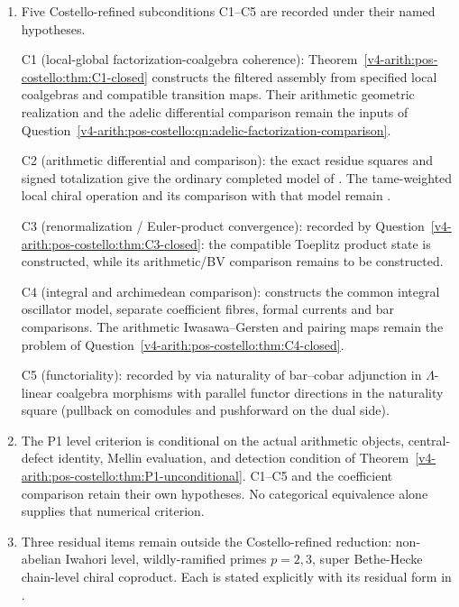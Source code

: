 \begin{enumerate}
\item Five Costello-refined subconditions C1--C5 are recorded under
their named hypotheses.

C1 (local-global factorization-coalgebra coherence):
Theorem~\ref{v4-arith:pos-costello:thm:C1-closed} constructs the
filtered assembly from specified local coalgebras and compatible
transition maps. Their arithmetic geometric realization and the
adelic differential comparison remain the inputs of
Question~\ref{v4-arith:pos-costello:qn:adelic-factorization-comparison}.

C2 (arithmetic differential and comparison): the exact residue
squares and signed totalization give the ordinary completed model
of . The tame-weighted
local chiral operation and its comparison with that model remain
.

C3 (renormalization / Euler-product convergence): recorded by
Question~\ref{v4-arith:pos-costello:thm:C3-closed}: the compatible
Toeplitz product state is constructed, while its arithmetic/BV
comparison remains to be constructed.

C4 (integral and archimedean comparison):
 constructs the common integral
oscillator model, separate coefficient fibres, formal currents and
bar comparisons. The arithmetic Iwasawa--Gersten and pairing maps
remain the problem of
Question~\ref{v4-arith:pos-costello:thm:C4-closed}.

C5 (functoriality): recorded by
 via naturality of
bar--cobar adjunction in \(\Lambda\)-linear coalgebra morphisms
with parallel functor directions in the naturality square
(pullback on comodules and pushforward on the dual side).

\item The P1 level criterion is conditional on the actual
arithmetic objects, central-defect identity, Mellin evaluation, and
detection condition of
Theorem~\ref{v4-arith:pos-costello:thm:P1-unconditional}.
C1--C5 and the coefficient comparison retain their own hypotheses.
No categorical equivalence alone supplies that numerical criterion.

\item Three residual items remain outside the Costello-refined
reduction: non-abelian Iwahori level, wildly-ramified primes
\(p=2,3\), super Bethe-Hecke chain-level chiral coproduct. Each
is stated explicitly with its residual form in
.


\end{enumerate}
